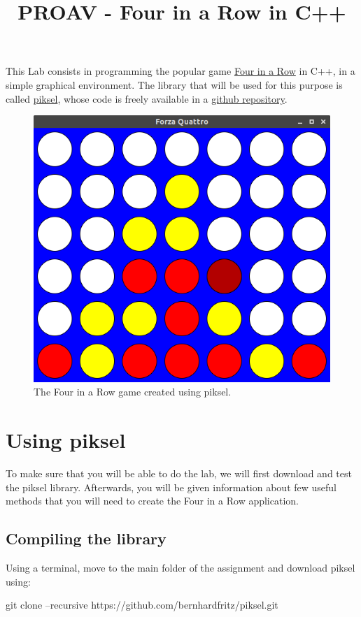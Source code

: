\documentclass{article}
\title{PROAV - Four in a Row in C++}
\date{}
\begin{document}
  
\maketitle


This Lab consists in programming the popular game \href{https://en.wikipedia.org/wiki/Connect_Four}{Four in a Row} in C++, in a simple graphical environment. The library that will be used for this purpose is called \href{https://bernhardfritz.github.io/piksel/}{piksel}, whose code is freely available in a \href{https://github.com/bernhardfritz/piksel}{github repository}.

\begin{figure}[htbp]
  \centering
  \includegraphics[width=.55\textwidth]{f4}
  \caption{The Four in a Row game created using piksel.}
\end{figure}

\section{Using piksel}

To make sure that you will be able to do the lab, we will first download and test the piksel library. Afterwards, you will be given information about few useful methods that you will need to create the Four in a Row application.

\subsection{Compiling the library}

Using a terminal, move to the main folder of the assignment and download piksel using:

\begin{center}
\ttfamily
git clone --recursive https://github.com/bernhardfritz/piksel.git
\end{center}
\end{document}
